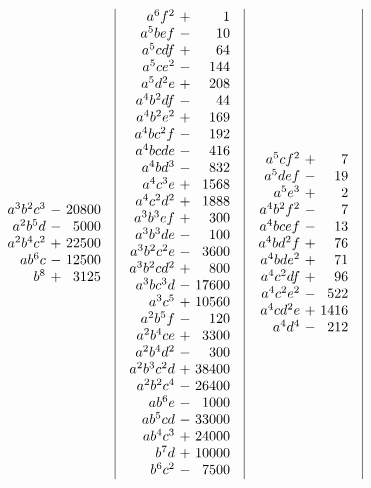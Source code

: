 \[\begin{array}{@{}c|c|c|c|c|c|c@{}}
\begin{array}{r@{\ }c@{\ }r}
a^3b^2c^3&-&20800\\
a^2b^5d&-&5000\\
a^2b^4c^2&+&22500\\
ab^6c&-&12500\\
b^8&+&3125
\end{array}
&
\begin{array}{r@{\ }c@{\ }r}
a^6f^2&+&1\\
a^5bef&-&10\\
a^5cdf&+&64\\
a^5ce^2&-&144\\
a^5d^2e&+&208\\
a^4b^2df&-&44\\
a^4b^2e^2&+&169\\
a^4bc^2f&-&192\\
a^4bcde&-&416\\
a^4bd^3&-&832\\
a^4c^3e&+&1568\\
a^4c^2d^2&+&1888\\
a^3b^3ef&+&300\\
a^3b^3de&-&100\\
a^3b^2c^2e&-&3600\\
a^3b^2cd^2&+&800\\
a^3bc^3d&-&17600\\
a^3c^5&+&10560\\
a^2b^5f&-&120\\
a^2b^4ce&+&3300\\
a^2b^4d^2&-&300\\
a^2b^3c^2d&+&38400\\
a^2b^2c^4&-&26400\\
ab^6e&-&1000\\
ab^5cd&-&33000\\
ab^4c^3&+&24000\\
b^7d&+&10000\\
b^6c^2&-&7500
\end{array}
&
\begin{array}{r@{\ }c@{\ }r}
a^5cf^2&+&7\\
a^5def&-&19\\
a^5e^3&+&2\\
a^4b^2f^2&-&7\\
a^4bcef&-&13\\
a^4bd^2f&+&76\\
a^4bde^2&+&71\\
a^4c^2df&+&96\\
a^4c^2e^2&-&522\\
a^4cd^2e&+&1416\\
a^4d^4&-&212\\

\end{array}
\end{array}\]
